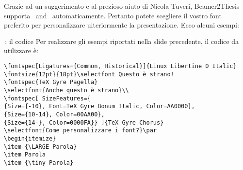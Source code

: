 \begin{tframe}{\XeLaTeX}
Grazie ad un suggerimento e al prezioso aiuto di Nicola Tuveri, Beamer2Thesis supporta \XeTeX\, and \XeLaTeX\, automaticamente.
Pertanto potete scegliere il vostro font preferito per personalizzare ulteriormente la presentazione. Ecco alcuni esempi:\\
\end{tframe}

\begin{frame}[t,fragile]{\XeLaTeX\,: il codice}
Per realizzare gli esempi riportati nella slide precedente, il codice da utilizzare è:
\scriptsize{
\begin{verbatim}
\fontspec[Ligatures={Common, Historical}]{Linux Libertine O Italic}
\fontsize{12pt}{18pt}\selectfont Questo è strano! 
\fontspec{TeX Gyre Pagella}
\selectfont{Anche questo è strano}\\
\fontspec[ SizeFeatures={
{Size={-10}, Font=TeX Gyre Bonum Italic, Color=AA0000},
{Size={10-14}, Color=00AA00},
{Size={14-}, Color=0000FA}} ]{TeX Gyre Chorus}
\selectfont{Come personalizzare i font?}\par
\begin{itemize}
\item {\LARGE Parola}
\item Parola
\item {\tiny Parola}
\end{verbatim}
}
\end{frame}

